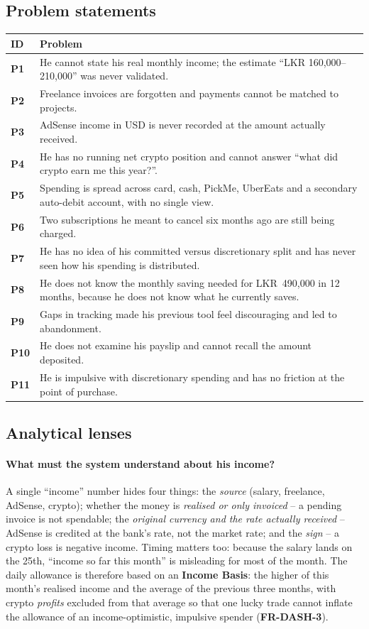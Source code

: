 \documentclass[11pt,a4paper]{article}
\newcommand{\req}[1]{\textsf{\textbf{\color{pfgreendark}#1}}}
\newcommand{\prob}[1]{\textsf{\textbf{\color{pfamberdark}#1}}}
\newcommand{\lkr}[1]{LKR~#1}
\begin{document}
\subsection{Problem statements}
\begin{tabularx}{\textwidth}{|>{\raggedright\arraybackslash}p{0.7cm}|L|}
\hline
\textbf{ID} & \textbf{Problem}\\
\hline
\prob{P1} & He cannot state his real monthly income; the estimate ``LKR 160,000--210,000'' was never validated.\\
\prob{P2} & Freelance invoices are forgotten and payments cannot be matched to projects.\\
\prob{P3} & AdSense income in USD is never recorded at the amount actually received.\\
\prob{P4} & He has no running net crypto position and cannot answer ``what did crypto earn me this year?''.\\
\prob{P5} & Spending is spread across card, cash, PickMe, UberEats and a secondary auto-debit account, with no single view.\\
\prob{P6} & Two subscriptions he meant to cancel six months ago are still being charged.\\
\prob{P7} & He has no idea of his committed versus discretionary split and has never seen how his spending is distributed.\\
\prob{P8} & He does not know the monthly saving needed for \lkr{490,000} in 12 months, because he does not know what he currently saves.\\
\prob{P9} & Gaps in tracking made his previous tool feel discouraging and led to abandonment.\\
\prob{P10} & He does not examine his payslip and cannot recall the amount deposited.\\
\prob{P11} & He is impulsive with discretionary spending and has no friction at the point of purchase.\\
\hline
\end{tabularx}

\subsection{Analytical lenses}
\paragraph{What must the system understand about his income?} A single ``income'' number hides four things: the \emph{source} (salary, freelance, AdSense, crypto); whether the money is \emph{realised or only invoiced} -- a pending invoice is not spendable; the \emph{original currency and the rate actually received} -- AdSense is credited at the bank's rate, not the market rate; and the \emph{sign} -- a crypto loss is negative income. Timing matters too: because the salary lands on the 25th, ``income so far this month'' is misleading for most of the month. The daily allowance is therefore based on an \textbf{Income Basis}: the higher of this month's realised income and the average of the previous three months, with crypto \emph{profits} excluded from that average so that one lucky trade cannot inflate the allowance of an income-optimistic, impulsive spender (\req{FR-DASH-3}).
\end{document}
